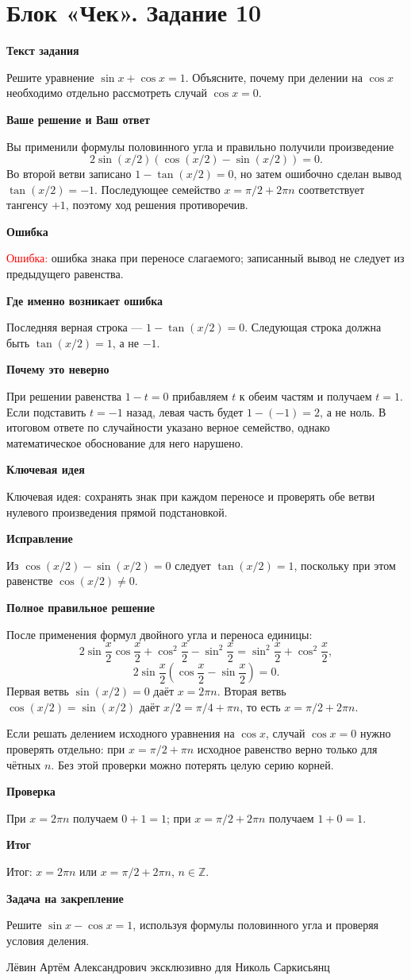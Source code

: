 \documentclass[11pt,a4paper]{article}
\newcommand{\Part}[1]{\par\medskip\noindent\textbf{#1}\par\smallskip}
\newcommand{\Task}[2]{\clearpage\phantomsection\label{task:#1}\section*{#2}}
\newcommand{\Err}[1]{\textcolor{red}{Ошибка:} #1}
\newcommand{\Idea}[1]{\textcolor{blue!60!black}{Ключевая идея:} #1}
\newcommand{\Result}[1]{\textcolor{teal!60!black}{Итог:} #1}
\begin{document}
\Task{c10}{Блок «Чек». Задание 10}
\Part{Текст задания}
Решите уравнение $\sin x+\cos x=1$. Объясните, почему при делении на $\cos x$ необходимо отдельно рассмотреть случай $\cos x=0$.
\Part{Ваше решение и Ваш ответ}
Вы применили формулы половинного угла и правильно получили произведение
\[2\sin(x/2)(\cos(x/2)-\sin(x/2))=0.\]
Во второй ветви записано $1-\tan(x/2)=0$, но затем ошибочно сделан вывод $\tan(x/2)=-1$. Последующее семейство $x=\pi/2+2\pi n$ соответствует тангенсу $+1$, поэтому ход решения противоречив.
\Part{Ошибка}
\Err{ошибка знака при переносе слагаемого; записанный вывод не следует из предыдущего равенства.}
\Part{Где именно возникает ошибка}
Последняя верная строка --- $1-\tan(x/2)=0$. Следующая строка должна быть $\tan(x/2)=1$, а не $-1$.
\Part{Почему это неверно}
При решении равенства $1-t=0$ прибавляем $t$ к обеим частям и получаем $t=1$. Если подставить $t=-1$ назад, левая часть будет $1-(-1)=2$, а не ноль. В итоговом ответе по случайности указано верное семейство, однако математическое обоснование для него нарушено.
\Part{Ключевая идея}
\Idea{сохранять знак при каждом переносе и проверять обе ветви нулевого произведения прямой подстановкой.}
\Part{Исправление}
Из $\cos(x/2)-\sin(x/2)=0$ следует $\tan(x/2)=1$, поскольку при этом равенстве $\cos(x/2)\ne0$.
\Part{Полное правильное решение}
После применения формул двойного угла и переноса единицы:
\[2\sin\frac x2\cos\frac x2+\cos^2\frac x2-\sin^2\frac x2=\sin^2\frac x2+\cos^2\frac x2,\]
\[2\sin\frac x2\left(\cos\frac x2-\sin\frac x2\right)=0.\]
Первая ветвь $\sin(x/2)=0$ даёт $x=2\pi n$. Вторая ветвь $\cos(x/2)=\sin(x/2)$ даёт $x/2=\pi/4+\pi n$, то есть $x=\pi/2+2\pi n$.

Если решать делением исходного уравнения на $\cos x$, случай $\cos x=0$ нужно проверять отдельно: при $x=\pi/2+\pi n$ исходное равенство верно только для чётных $n$. Без этой проверки можно потерять целую серию корней.
\Part{Проверка}
При $x=2\pi n$ получаем $0+1=1$; при $x=\pi/2+2\pi n$ получаем $1+0=1$.
\Part{Итог}
\Result{$x=2\pi n$ или $x=\pi/2+2\pi n$, $n\in\mathbb Z$.}
\Part{Задача на закрепление}
Решите $\sin x-\cos x=1$, используя формулы половинного угла и проверяя условия деления.

\vfill
\begin{center}\small Лёвин Артём Александрович эксклюзивно для Николь Саркисьянц\end{center}
\end{document}

